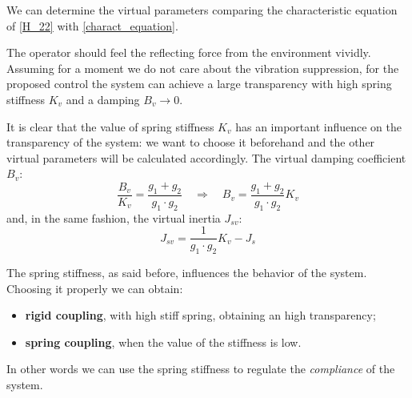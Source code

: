 We can determine the virtual parameters comparing the characteristic equation of \eqref{H_22} with \eqref{charact_equation}.

The operator should feel the reflecting force from the environment vividly. Assuming for a moment we do not care about the vibration suppression, for the proposed control the system can achieve a large transparency with high spring stiffness $ K_v $ and a damping $ B_v \rightarrow 0 $. 

It is clear that the value of spring stiffness $ K_v $ has an important influence on the transparency of the system: we want to choose it beforehand and the other virtual parameters will be calculated accordingly.
The virtual damping coefficient $ B_v $:
\begin{equation}
	\frac{B_v}{K_v} = \frac{g_1 + g_2}{g_1 \cdot g_2} \quad \Rightarrow \quad B_v = \frac{g_1 + g_2}{g_1 \cdot g_2} K_v
\end{equation}
and, in the same fashion, the virtual inertia $ J_{sv} $:
\begin{equation}
	J_{sv} = \frac{1}{g_1 \cdot g_2} K_v - J_s
\end{equation}

The spring stiffness, as said before, influences the behavior of the system. Choosing it properly we can obtain:
\begin{itemize}
	\item \textbf{rigid coupling}, with high stiff spring, obtaining an high transparency;
	\item \textbf{spring coupling}, when the value of the stiffness is low.
\end{itemize}

In other words we can use the spring stiffness to regulate the \emph{compliance} of the system.